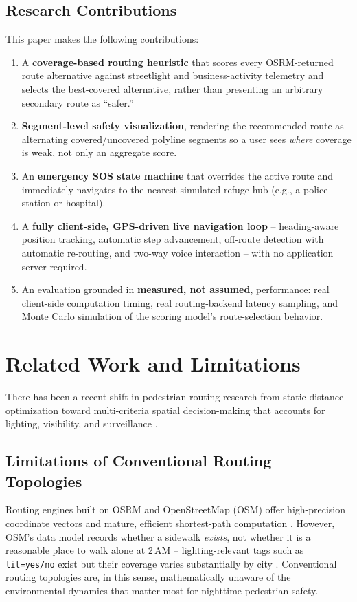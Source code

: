 \documentclass[conference]{IEEEtran}
\begin{document}
\subsection{Research Contributions}
This paper makes the following contributions:
\begin{enumerate}
\item A \textbf{coverage-based routing heuristic} that scores every OSRM-returned route alternative against streetlight and business-activity telemetry and selects the best-covered alternative, rather than presenting an arbitrary secondary route as ``safer.''
\item \textbf{Segment-level safety visualization}, rendering the recommended route as alternating covered/uncovered polyline segments so a user sees \emph{where} coverage is weak, not only an aggregate score.
\item An \textbf{emergency SOS state machine} that overrides the active route and immediately navigates to the nearest simulated refuge hub (e.g., a police station or hospital).
\item A \textbf{fully client-side, GPS-driven live navigation loop} -- heading-aware position tracking, automatic step advancement, off-route detection with automatic re-routing, and two-way voice interaction -- with no application server required.
\item An evaluation grounded in \textbf{measured, not assumed}, performance: real client-side computation timing, real routing-backend latency sampling, and Monte Carlo simulation of the scoring model's route-selection behavior.
\end{enumerate}

\section{Related Work and Limitations}
\label{sec:related}

There has been a recent shift in pedestrian routing research from static distance optimization toward multi-criteria spatial decision-making that accounts for lighting, visibility, and surveillance \cite{welsh2008,chalfin2022}.

\subsection{Limitations of Conventional Routing Topologies}
Routing engines built on OSRM and OpenStreetMap (OSM) offer high-precision coordinate vectors and mature, efficient shortest-path computation \cite{osrm, valhalla, osmnx}. However, OSM's data model records whether a sidewalk \emph{exists}, not whether it is a reasonable place to walk alone at 2\,AM -- lighting-relevant tags such as \texttt{lit=yes/no} exist but their coverage varies substantially by city \cite{osmwiki}. Conventional routing topologies are, in this sense, mathematically unaware of the environmental dynamics that matter most for nighttime pedestrian safety.
\end{document}
